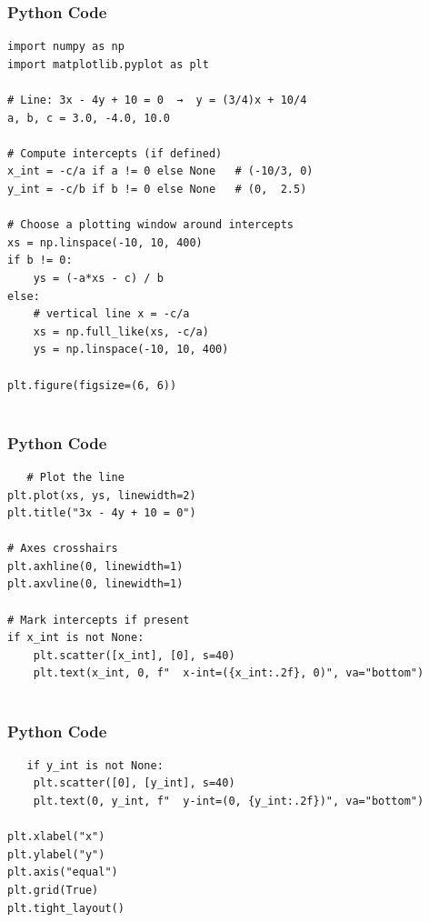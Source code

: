 \documentclass{beamer}
\begin{document}
\begin{frame}[fragile]
\frametitle{Python Code}
\begin{lstlisting}
import numpy as np
import matplotlib.pyplot as plt

# Line: 3x - 4y + 10 = 0  →  y = (3/4)x + 10/4
a, b, c = 3.0, -4.0, 10.0

# Compute intercepts (if defined)
x_int = -c/a if a != 0 else None   # (-10/3, 0)
y_int = -c/b if b != 0 else None   # (0,  2.5)

# Choose a plotting window around intercepts
xs = np.linspace(-10, 10, 400)
if b != 0:
    ys = (-a*xs - c) / b
else:
    # vertical line x = -c/a
    xs = np.full_like(xs, -c/a)
    ys = np.linspace(-10, 10, 400)

plt.figure(figsize=(6, 6))


    \end{lstlisting}
\end{frame}

\begin{frame}[fragile]
    \frametitle{Python Code}
    \begin{lstlisting}
   # Plot the line
plt.plot(xs, ys, linewidth=2)
plt.title("3x - 4y + 10 = 0")

# Axes crosshairs
plt.axhline(0, linewidth=1)
plt.axvline(0, linewidth=1)

# Mark intercepts if present
if x_int is not None:
    plt.scatter([x_int], [0], s=40)
    plt.text(x_int, 0, f"  x-int=({x_int:.2f}, 0)", va="bottom")


    \end{lstlisting}
\end{frame}

 \begin{frame}[fragile]
    \frametitle{ Python Code}
    \begin{lstlisting}
   if y_int is not None:
    plt.scatter([0], [y_int], s=40)
    plt.text(0, y_int, f"  y-int=(0, {y_int:.2f})", va="bottom")

plt.xlabel("x")
plt.ylabel("y")
plt.axis("equal")
plt.grid(True)
plt.tight_layout()
\end{lstlisting}
\end{frame}
\end{document}
